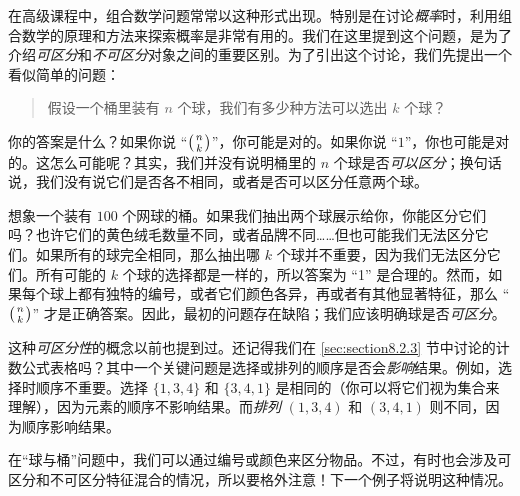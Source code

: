 在高级课程中，组合数学问题常常以这种形式出现。特别是在讨论\emph{概率}时，利用组合数学的原理和方法来探索概率是非常有用的。我们在这里提到这个问题，是为了介绍\emph{可区分}和\emph{不可区分}对象之间的重要区别。为了引出这个讨论，我们先提出一个看似简单的问题：
\begin{quotation}
    假设一个桶里装有 $n$ 个球，我们有多少种方法可以选出 $k$ 个球？
\end{quotation}
你的答案是什么？如果你说 ``$\big({n \atop k}\big)$''，你可能是对的。如果你说 ``$1$''，你也可能是对的。这怎么可能呢？其实，我们并没有说明桶里的 $n$ 个球是否\emph{可以区分}；换句话说，我们没有说它们是否各不相同，或者是否可以区分任意两个球。

想象一个装有 $100$ 个网球的桶。如果我们抽出两个球展示给你，你能区分它们吗？也许它们的黄色绒毛数量不同，或者品牌不同……但也可能我们无法区分它们。如果所有的球完全相同，那么抽出哪 $k$ 个球并不重要，因为我们无法区分它们。所有可能的 $k$ 个球的选择都是一样的，所以答案为 ``1'' 是合理的。然而，如果每个球上都有独特的编号，或者它们颜色各异，再或者有其他显著特征，那么 ``$\big({n \atop k}\big)$'' 才是正确答案。因此，最初的问题存在缺陷；我们应该明确球是否\emph{可区分}。

这种\emph{可区分性}的概念以前也提到过。还记得我们在 \ref{sec:section8.2.3} 节中讨论的计数公式表格吗？其中一个关键问题是选择或排列的顺序是否会\emph{影响}结果。例如，选择时顺序不重要。选择 $\{1, 3, 4\}$ 和 $\{3, 4, 1\}$ 是相同的（你可以将它们视为集合来理解），因为元素的顺序不影响结果。而\emph{排列} $(1, 3, 4)$ 和 $(3, 4, 1)$ 则不同，因为顺序影响结果。

在``球与桶''问题中，我们可以通过编号或颜色来区分物品。不过，有时也会涉及可区分和不可区分特征混合的情况，所以要格外注意！下一个例子将说明这种情况。\\


